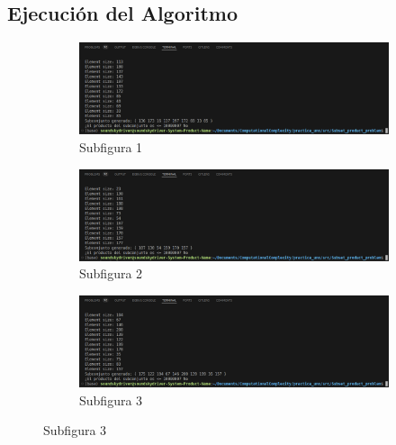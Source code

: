 \documentclass{article}
\begin{document}
\subsection{Ejecución del Algoritmo}
\begin{figure}[H]  %
    \centering
    \begin{subfigure}{0.7\textwidth}
        \centering
        \includegraphics[width=\textwidth]{../images/Screenshot from 2024-09-19 23-21-09.png}
        \caption{Subfigura 1}
        \label{fig:subfig1}
    \end{subfigure}
    \hfill
    \begin{subfigure}{0.7\textwidth}
        \centering
        \includegraphics[width=\textwidth]{../images/Screenshot from 2024-09-19 23-21-12.png}
        \caption{Subfigura 2}
        \label{fig:subfig2}
    \end{subfigure}
    \hfill
    \begin{subfigure}{0.7\textwidth}
        \centering
        \includegraphics[width=\textwidth]{../images/Screenshot from 2024-09-19 23-21-17.png}
        \caption{Subfigura 3}
        \label{fig:subfig3}
    \end{subfigure}

    \vspace{10pt}  %


\end{figure}
\end{document}
